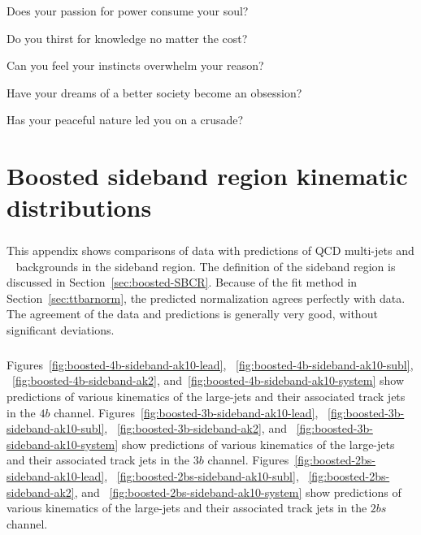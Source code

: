 \begin{savequote}[75mm]
Does your passion for power consume your soul?

Do you thirst for knowledge no matter the cost?

Can you feel your instincts overwhelm your reason? 

Have your dreams of a better society become an obsession?

Has your peaceful nature led you on a crusade? 
\end{savequote}
\chapter{Boosted sideband region kinematic distributions}
\label{AppendixSB}

\paragraph{}
This appendix shows comparisons of data with predictions of QCD multi-jets and \ttbar~ backgrounds in the sideband region.  
The definition of the sideband region is discussed in Section~\ref{sec:boosted-SBCR}.
Because of the fit method in Section~\ref{sec:ttbarnorm}, the predicted normalization agrees perfectly with data.
The agreement of the data and predictions is generally very good, without significant deviations.

\paragraph{}
Figures~\ref{fig:boosted-4b-sideband-ak10-lead}, ~\ref{fig:boosted-4b-sideband-ak10-subl}, ~\ref{fig:boosted-4b-sideband-ak2}, and~\ref{fig:boosted-4b-sideband-ak10-system} show predictions of various kinematics of the large-\R jets and their associated track jets in the $4b$ channel.
Figures~\ref{fig:boosted-3b-sideband-ak10-lead}, ~\ref{fig:boosted-3b-sideband-ak10-subl}, ~\ref{fig:boosted-3b-sideband-ak2}, and ~\ref{fig:boosted-3b-sideband-ak10-system} show predictions of various kinematics of the large-\R jets and their associated track jets in the $3b$ channel.
Figures~\ref{fig:boosted-2bs-sideband-ak10-lead}, ~\ref{fig:boosted-2bs-sideband-ak10-subl}, ~\ref{fig:boosted-2bs-sideband-ak2}, and ~\ref{fig:boosted-2bs-sideband-ak10-system} show predictions of various kinematics of the large-\R jets and their associated track jets in the $2bs$ channel.


